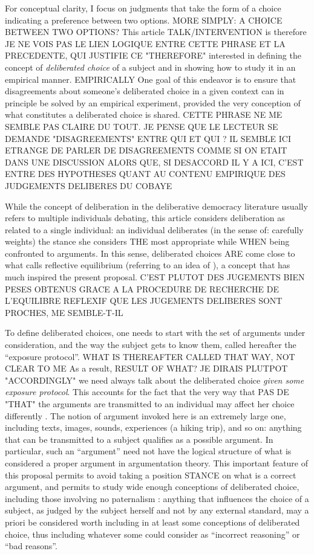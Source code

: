 \documentclass[version=last, pagesize, twoside=off, bibliography=totoc, DIV=calc, fontsize=12pt, a4paper, french, english]{scrartcl}
\begin{document}
For conceptual clarity, I focus on judgments that take the form of a choice indicating a preference between two options. MORE SIMPLY: A CHOICE BETWEEN TWO OPTIONS?
This article TALK/INTERVENTION is therefore JE NE VOIS PAS LE LIEN LOGIQUE ENTRE CETTE PHRASE ET LA PRECEDENTE, QUI JUSTIFIE CE "THEREFORE" interested in defining the concept of \emph{deliberated choice} of a subject and in showing how to study it in an empirical manner. EMPIRICALLY
One goal of this endeavor is to ensure that disagreements about someone’s deliberated choice in a given context can in principle be solved by an empirical experiment, provided the very conception of what constitutes a deliberated choice is shared. CETTE PHRASE NE ME SEMBLE PAS CLAIRE DU TOUT. JE PENSE QUE LE LECTEUR SE DEMANDE "DISAGREEMENTS" ENTRE QUI ET QUI ? IL SEMBLE ICI ETRANGE DE PARLER DE DISAGREEMENTS COMME SI ON ETAIT DANS UNE DISCUSSION ALORS QUE, SI DESACCORD IL Y A ICI, C'EST ENTRE DES HYPOTHESES QUANT AU CONTENU EMPIRIQUE DES JUDGEMENTS DELIBERES DU COBAYE 

While the concept of deliberation in the deliberative democracy literature usually refers to multiple individuals debating, this article considers deliberation as related to a single individual: an individual deliberates (in the sense of: carefully weights) the stance she considers THE most appropriate while WHEN being confronted to arguments. In this sense, deliberated choices ARE come close to what \citet{rawls_theory_1999} calls reflective equilibrium (referring to an idea of \citet{goodman_fact_1983}), a concept that has much inspired the present proposal. C'EST PLUTOT DES JUGEMENTS BIEN PESES OBTENUS GRACE A LA PROCEDURE DE RECHERCHE DE L'EQUILIBRE REFLEXIF QUE LES JUGEMENTS DELIBERES SONT PROCHES, ME SEMBLE-T-IL

To define deliberated choices, one needs to start with the set of arguments under consideration, and the way the subject gets to know them, called hereafter the “exposure protocol”. WHAT IS THEREAFTER CALLED THAT WAY, NOT CLEAR TO ME
As a result, RESULT OF WHAT? JE DIRAIS PLUTPOT "ACCORDINGLY" we need always talk about the deliberated choice \emph{given some exposure protocol}. 
This accounts for the fact that the very way that PAS DE "THAT" the arguments are transmitted to an individual may affect her choice differently \citep{railton_facts_2003}. 
The notion of argument invoked here is an extremely large one, including texts, images, sounds, experiences (a hiking trip), and so on: anything that can be transmitted to a subject qualifies as a possible argument. In particular, such an “argument” need not have the logical structure of what is considered a proper argument in argumentation theory. This important feature of this proposal permits to avoid taking a position STANCE on what is a correct argument, and permits to study wide enough conceptions of deliberated choice, including those involving no paternalism \citep{cailloux_formal_2020}: anything that influences the choice of a subject, as judged by the subject herself and not by any external standard, may a priori be considered worth including in at least some conceptions of deliberated choice, thus including whatever some could consider as “incorrect reasoning” or “bad reasons”.
\end{document}
